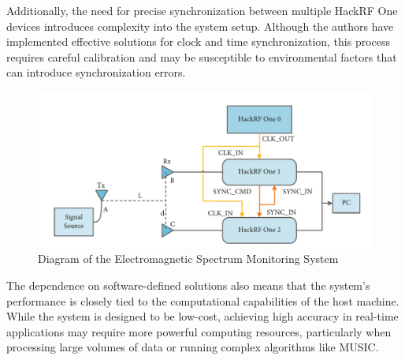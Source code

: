 \documentclass{article}
\begin{document}
Additionally, the need for precise synchronization between multiple HackRF One devices introduces complexity into the system setup. Although the authors have implemented effective solutions for clock and time synchronization, this process requires careful calibration and may be susceptible to environmental factors that can introduce synchronization errors.


\begin{figure}[h!]
    \centering
    \includegraphics[width=\textwidth]{figures/doa3.png}
    \caption{Diagram of the Electromagnetic Spectrum Monitoring System}
    \label{fig:blocks}
\end{figure}

The dependence on software-defined solutions also means that the system's performance is closely tied to the computational capabilities of the host machine. While the system is designed to be low-cost, achieving high accuracy in real-time applications may require more powerful computing resources, particularly when processing large volumes of data or running complex algorithms like MUSIC.
\end{document}
